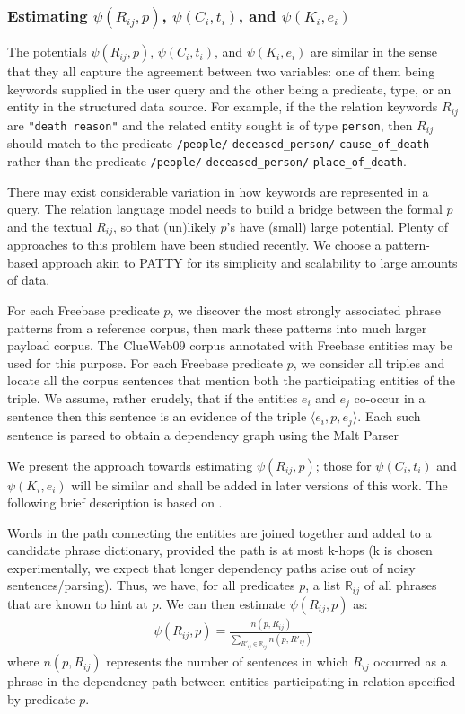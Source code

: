 \documentclass[a4paper, twoside, 12pt]{report}
\begin{document}
\subsubsection{Estimating $\psi(R_{ij}, p)$, $\psi(C_i, t_i)$, and $\psi(K_i, e_i)$}
The  potentials $\psi(R_{ij}, p)$, $\psi(C_i, t_i)$, and $\psi(K_i, e_i)$ are similar in the sense that they all capture the agreement between two variables: one of them being keywords supplied in the user query and the other being a predicate, type, or an entity in the structured data source. 
For example, if the the relation keywords $R_{ij}$ are \texttt{"death reason"} and the related entity sought is of type \texttt{person}, then $R_{ij}$ should match to the predicate \texttt{/people/} \texttt{deceased\_person/} \texttt{cause\_of\_death} rather than the predicate \texttt{/people/} \texttt{deceased\_person/} \texttt{place\_of\_death}.

There may exist considerable variation in how keywords are represented in a query. The relation language model needs to build a bridge between the formal $p$ and the textual $R_{ij}$, so that (un)likely $p$'s have (small) large potential. Plenty of approaches \cite{berant2013semantic, berant2014semantic, kwiatkowski2013scaling, yih2014semantic} to this problem have been studied recently. We choose a pattern-based approach akin to PATTY \cite{nakashole2012patty} for its simplicity and scalability to large amounts of data.

For each Freebase predicate $p$, we discover the most strongly associated phrase patterns from a reference corpus, then mark these patterns into much larger payload corpus. 
The ClueWeb09 corpus annotated with Freebase entities \cite{gabrilovich2013facc1} may be used for this purpose. For each Freebase predicate $p$, we consider all triples and locate all the corpus sentences that mention both the participating entities of the triple. We assume, rather crudely, that if the entities $e_i$ and $e_j$ co-occur in a sentence then this sentence is an evidence of the triple $\langle e_i, p, e_j \rangle$. Each such sentence is parsed to obtain a dependency graph using the Malt Parser \cite{nivre2007maltparser}

We present the approach towards estimating $\psi(R_{ij}, p)$; those for $\psi(C_i, t_i)$ and $\psi(K_i, e_i)$ will be similar and shall be added in later versions of this work. The following brief description is based on \cite{joshiknowledge}.

Words in the path connecting the entities are joined together and added to a candidate phrase dictionary, provided the path is at most k-hops (k is chosen experimentally, we expect that longer dependency paths arise out of noisy sentences/parsing). Thus, we have, for all predicates $p$, a list $\mathbb{R}_{ij}$ of all phrases that are known to hint at $p$. We can then estimate $\psi(R_{ij}, p)$ as:
\begin{align}
\psi(R_{ij}, p) = \frac{n(p, R_{ij})}{\sum_{R'_{ij} \in \mathbb{R}_{ij}}{n(p, R'_{ij})}}
\end{align}
 where $n(p, R_{ij})$ represents the number of sentences in which $R_{ij}$ occurred as a phrase in the dependency path between entities participating in relation specified by predicate $p$.
\end{document}
